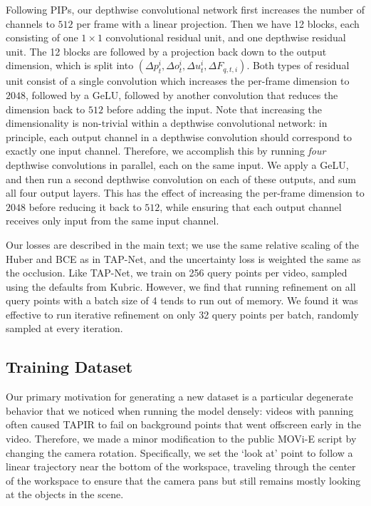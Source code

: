 \documentclass[10pt,twocolumn,letterpaper]{article}
\begin{document}
Following PIPs, our depthwise convolutional network first increases the number of channels to $512$ per frame with a linear projection.  Then we have 12 blocks, each consisting of one $1\times 1$ convolutional residual unit, and one depthwise residual unit.  The 12 blocks are followed by a projection back down to the output dimension, which is split into $(\Delta p^i_t, \Delta o^i_t, \Delta u^i_t, \Delta F_{q,t,i})$.  Both types of residual unit consist of a single convolution which increases the per-frame dimension to $2048$, followed by a GeLU, followed by another convolution that reduces the dimension back to $512$ before adding the input.  Note that increasing the dimensionality is non-trivial within a depthwise convolutional network: in principle, each output channel in a depthwise convolution should correspond to exactly one input channel.  Therefore, we accomplish this by running \emph{four} depthwise convolutions in parallel, each on the same input.  We apply a GeLU, and then run a second depthwise convolution on each of these outputs, and sum all four output layers.  This has the effect of increasing the per-frame dimension to $2048$ before reducing it back to $512$, while ensuring that each output channel receives only input from the same input channel.  

Our losses are described in the main text; we use the same relative scaling of the Huber and BCE as in TAP-Net, and the uncertainty loss is weighted the same as the occlusion.  Like TAP-Net, we train on 256 query points per video, sampled using the defaults from Kubric.  However, we find that running refinement on all query points with a batch size of 4 tends to run out of memory.  We found it was effective to run iterative refinement on only 32 query points per batch, randomly sampled at every iteration. 

\subsection{Training Dataset}
\label{sec:training_dataset}
Our primary motivation for generating a new dataset is a particular degenerate behavior that we noticed when running the model densely: videos with panning often caused TAPIR to fail on background points that went offscreen early in the video.  Therefore, we made a minor modification to the public MOVi-E script by changing the camera rotation.  Specifically, we set the `look at' point to follow a linear trajectory near the bottom of the workspace, traveling through the center of the workspace to ensure that the camera pans but still remains mostly looking at the objects in the scene.
\end{document}
